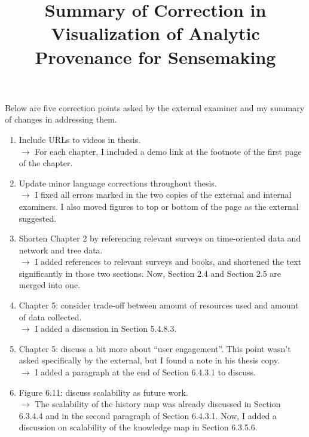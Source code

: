 \documentclass[12pt]{article}
\title{Summary of Correction in \\\textbf{Visualization of Analytic Provenance for Sensemaking}}
\date{}
\begin{document}
\maketitle

Below are five correction points asked by the external examiner and my summary of changes in addressing them.

\begin{enumerate}
	\item Include URLs to videos in thesis.
	\\ $\rightarrow$ For each chapter, I included a demo link at the footnote of the first page of the chapter.
	
	\item Update minor language corrections throughout thesis.
	\\ $\rightarrow$ I fixed all errors marked in the two copies of the external and internal examiners. I also moved figures to top or bottom of the page as the external suggested.
	
	\item Shorten Chapter 2 by referencing relevant surveys on time-oriented data and network and tree data.
	\\ $\rightarrow$ I added references to relevant surveys and books, and shortened the text significantly in those two sections. Now, Section 2.4 and Section 2.5 are merged into one.
	
	\item Chapter 5: consider trade-off between amount of resources used and amount of data collected.
	\\ $\rightarrow$ I added a discussion in Section 5.4.8.3.
	
	\item Chapter 5: discuss a bit more about ``user engagement''. This point wasn't asked specifically by the external, but I found a note in his thesis copy.
	\\ $\rightarrow$ I added a paragraph at the end of Section 6.4.3.1 to discuss.
	
	\item Figure 6.11: discuss scalability as future work.
	\\ $\rightarrow$ The scalability of the history map was already discussed in Section 6.3.4.4 and in the second paragraph of Section 6.4.3.1. Now, I added a discussion on scalability of the knowledge map in Section 6.3.5.6.
\end{enumerate}
\end{document}
